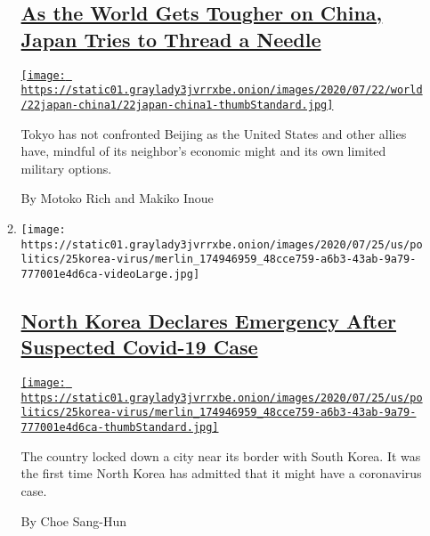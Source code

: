 \begin{enumerate}
\begin{enumerate}
    \hypertarget{as-the-world-gets-tougher-on-china-japan-tries-to-thread-a-needle}{%
    \subsection{\texorpdfstring{\href{/2020/07/25/world/asia/japan-china-xi.html}{As
    the World Gets Tougher on China, Japan Tries to Thread a
    Needle}}{As the World Gets Tougher on China, Japan Tries to Thread a Needle}}\label{as-the-world-gets-tougher-on-china-japan-tries-to-thread-a-needle}}

    \href{/2020/07/25/world/asia/japan-china-xi.html}{\texttt{[image: https://static01.graylady3jvrrxbe.onion/images/2020/07/22/world/22japan-china1/22japan-china1-thumbStandard.jpg]}}

    Tokyo has not confronted Beijing as the United States and other
    allies have, mindful of its neighbor's economic might and its own
    limited military options.

    By Motoko Rich and Makiko Inoue
  \item
    \texttt{[image: https://static01.graylady3jvrrxbe.onion/images/2020/07/25/us/politics/25korea-virus/merlin\_174946959\_48cce759-a6b3-43ab-9a79-777001e4d6ca-videoLarge.jpg]}

    \hypertarget{north-korea-declares-emergency-after-suspected-covid-19-case}{%
    \subsection{\texorpdfstring{\href{/2020/07/25/world/asia/north-korea-coronavirus-kim-jong-un.html}{North
    Korea Declares Emergency After Suspected Covid-19
    Case}}{North Korea Declares Emergency After Suspected Covid-19 Case}}\label{north-korea-declares-emergency-after-suspected-covid-19-case}}

    \href{/2020/07/25/world/asia/north-korea-coronavirus-kim-jong-un.html}{\texttt{[image: https://static01.graylady3jvrrxbe.onion/images/2020/07/25/us/politics/25korea-virus/merlin\_174946959\_48cce759-a6b3-43ab-9a79-777001e4d6ca-thumbStandard.jpg]}}

    The country locked down a city near its border with South Korea. It
    was the first time North Korea has admitted that it might have a
    coronavirus case.

    By Choe Sang-Hun
  \end{enumerate}
\end{enumerate}

